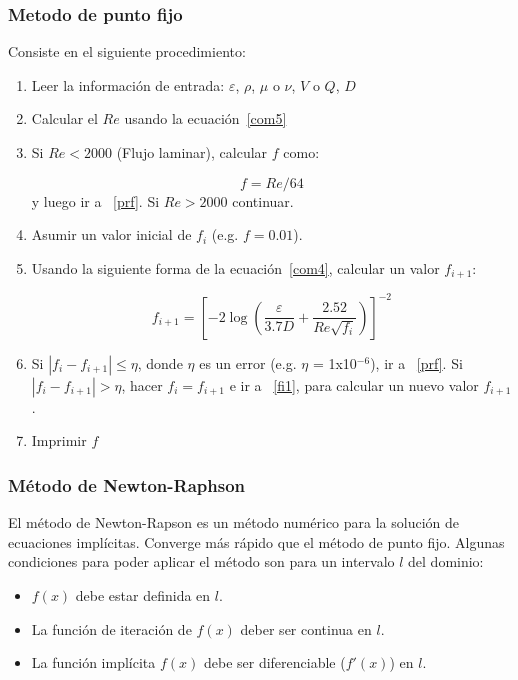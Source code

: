 \documentclass[11pt, oneside]{article}
\begin{document}
\subsubsection{Metodo de punto fijo} \label{sec:pf}
Consiste en el siguiente procedimiento:
\begin{enumerate} 
\item Leer la informaci\'on de entrada: $\varepsilon$, $\rho$, $\mu$ o $\nu$, $V$ o $Q$, $D$ 
\item Calcular el $Re$ usando la ecuaci\'on~\ref{com5}
\item Si $Re<2000$ (Flujo laminar), calcular $f$ como:

\begin{equation}
f=Re/64  
\label{com8}
\end{equation}
y luego ir a ~\ref{prf}. Si $Re > 2000$ continuar.

\item Asumir un valor inicial de $f_i$ (e.g. $f=0.01$).
\item \label{fi1} Usando la siguiente forma de la ecuaci\'on~\ref{com4}, calcular un valor $f_{i+1}$:

\begin{equation}
 f_{i+1} = \left[-2 \log \left( \frac{\varepsilon}{3.7D} + \frac{2.52}{Re \sqrt{f_i}} \right) \right]^{-2}
\label{com8}
\end{equation}

\item Si $|f_{i}- f_{i+1}| \leq \eta$, donde $\eta$ es un error  (e.g. $\eta$ = 1x10$^{-6}$), ir a ~\ref{prf}. Si $|f_{i}- f_{i+1}| > \eta$, hacer $f_i = f_{i+1}$ e ir a ~\ref{fi1},  para  calcular un nuevo valor $f_{i+1}$.
\item \label{prf} Imprimir $f$
\end{enumerate} 

\subsubsection{M\'etodo de Newton-Raphson} \label{sec:nr}
El m\'etodo de Newton-Rapson es un m\'etodo num\'erico para la soluci\'on de ecuaciones impl\'icitas. Converge m\'as r\'apido que el m\'etodo de punto fijo. Algunas condiciones para poder aplicar el m\'etodo son para un intervalo $l$ del dominio:
\begin{itemize}
\item $f(x)$ debe estar definida en $l$.
\item La funci\'on de iteraci\'on de $f(x)$ deber ser continua en $l$.
\item La funci\'on impl\'icita $f(x)$ debe ser diferenciable ($f'(x)$) en $l$.
\end{itemize}
\end{document}
